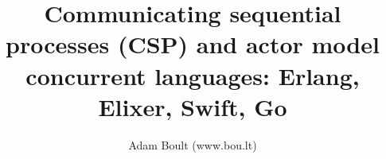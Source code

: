 \documentclass[oneside]{book}
\begin{document}
\author{Adam Boult (www.bou.lt)}
\title{Communicating sequential processes (CSP) and actor model concurrent languages: Erlang, Elixer, Swift, Go}
\maketitle

\setcounter{tocdepth}{0}
\tableofcontents


\end{document}
